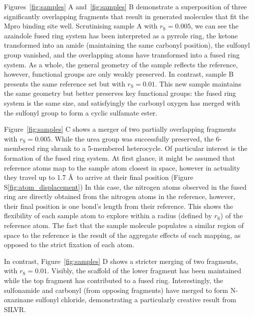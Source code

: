\documentclass[journal=jacsat,manuscript=article]{achemso}
\begin{document}
Figures~\ref{fig:samples} A and~\ref{fig:samples} B demonstrate a superposition of three significantly overlapping fragments that result in generated molecules that fit the Mpro binding site well. Scrutinising sample A with $r_{\mathrm{S}}=0.005$, we can see the azaindole fused ring system has been interpreted as a pyrrole ring, the ketone transformed into an amide (maintaining the same carbonyl position), the sulfonyl group vanished, and the overlapping atoms have transformed into a fused ring system. As a whole, the general geometry of the sample reflects the reference, however, functional groups are only weakly preserved. In contrast, sample B presents the same reference set but with $r_{\mathrm{S}}=0.01$. This new sample maintains the same geometry but better preserves key functional groups: the fused ring system is the same size, and satisfyingly the carbonyl oxygen has merged with the sulfonyl group to form a cyclic sulfamate ester.


Figure~\ref{fig:samples} C shows a merger of two partially overlapping fragments with $r_{\mathrm{S}}=0.005$. While the urea group was successfully preserved, the 6-membered ring shrank to a 5-membered heterocycle. Of particular interest is the formation of the fused ring system. At first glance, it might be assumed that reference atoms map to the sample atom closest in space, however in actuality they travel up to 1.7 \AA~to arrive at their final position (Figure S\ref{fig:atom_displacement}) In this case, the nitrogen atoms observed in the fused ring are directly obtained from the nitrogen atoms in the reference, however, their final position is one bond’s length from their reference. This shows the flexibility of each sample atom to explore within a radius (defined by $r_{\mathrm{S}}$) of the reference atom. The fact that the sample molecule populates a similar region of space to the reference is the result of the aggregate effects of each mapping, as opposed to the strict fixation of each atom. 

In contrast, Figure~\ref{fig:samples} D shows a stricter merging of two fragments, with $r_{\mathrm{S}}=0.01$. Visibly, the scaffold of the lower fragment has been maintained while the top fragment has contributed to a fused ring. Interestingly, the sulfonamide and carbonyl (from opposing fragments) have merged to form N-oxazinane sulfonyl chloride, demonstrating a particularly creative result from SILVR. 
\end{document}
